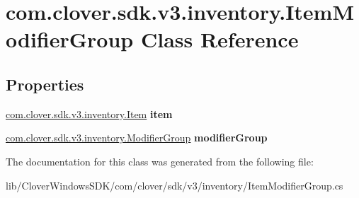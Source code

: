 \hypertarget{classcom_1_1clover_1_1sdk_1_1v3_1_1inventory_1_1_item_modifier_group}{}\section{com.\+clover.\+sdk.\+v3.\+inventory.\+Item\+Modifier\+Group Class Reference}
\label{classcom_1_1clover_1_1sdk_1_1v3_1_1inventory_1_1_item_modifier_group}
\subsection*{Properties}
\begin{DoxyCompactItemize}
\item 
\mbox{\label{classcom_1_1clover_1_1sdk_1_1v3_1_1inventory_1_1_item_modifier_group_ab39fde18f42d9ed724d20bff2261adbb}} 
\hyperlink{classcom_1_1clover_1_1sdk_1_1v3_1_1inventory_1_1_item}{com.\+clover.\+sdk.\+v3.\+inventory.\+Item} {\bfseries item}
\item 
\mbox{\label{classcom_1_1clover_1_1sdk_1_1v3_1_1inventory_1_1_item_modifier_group_a0f5080c613ec235d5374f51666563130}} 
\hyperlink{classcom_1_1clover_1_1sdk_1_1v3_1_1inventory_1_1_modifier_group}{com.\+clover.\+sdk.\+v3.\+inventory.\+Modifier\+Group} {\bfseries modifier\+Group}
\end{DoxyCompactItemize}


The documentation for this class was generated from the following file\+:\begin{DoxyCompactItemize}
\item 
lib/\+Clover\+Windows\+S\+D\+K/com/clover/sdk/v3/inventory/Item\+Modifier\+Group.\+cs\end{DoxyCompactItemize}
